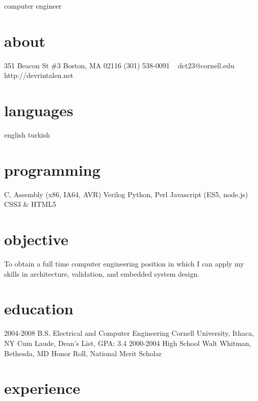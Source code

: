 \documentclass[]{friggeri-cv}
\begin{document}
       {computer engineer}


\begin{aside}
  \section{about}
    351 Beacon St \#3
    Boston, MA 02116
    (301) 538-0091
    ~
    dct23@cornell.edu
    http://devrintalen.net
  \section{languages}
    english
    turkish
  \section{programming}
    C, Assembly
    (x86, IA64, AVR)
    Verilog
    Python, Perl
    Javascript
    (ES5, node.js)
    CSS3 \& HTML5
\end{aside}

\section{objective}


To obtain a full time computer engineering position in which I can apply my skills in architecture, validation, and embedded system design.

\section{education}

\begin{entrylist}
  \entry
    {2004-2008}
    {B.S. {\normalfont Electrical and Computer Engineering}}
    {Cornell University, Ithaca, NY}
    {Cum Laude, Dean's List, GPA: 3.4}
  \entry
    {2000-2004}
    {High School}
    {Walt Whitman, Bethesda, MD}
    {Honor Roll, National Merit Scholar}
\end{entrylist}

\section{experience}
\end{document}
